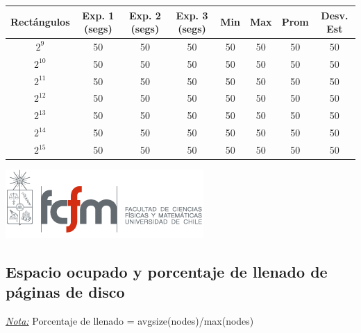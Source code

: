 \documentclass[letterpaper,10pt]{article}
\begin{document}
	\begin{center}

		\begin{tabular}{|c|c|c|c|c|c|c|c|}
			\hline
			Rectángulos	& Exp. 1 (segs) & Exp. 2 (segs) & Exp. 3 (segs) & Min & Max & Prom & Desv. Est\\
			\hline
			$2^{9}$ 	& 50 	& 50 	& 50 	& 50 	& 50 	& 50 	& 50 \\
			\hline
			$2^{10}$ 	& 50 	& 50 	& 50 	& 50 	& 50 	& 50 	& 50 \\
			\hline
			$2^{11}$ 	& 50 	& 50 	& 50 	& 50 	& 50 	& 50 	& 50 \\
			\hline
			$2^{12}$ 	& 50 	& 50 	& 50 	& 50 	& 50 	& 50 	& 50 \\
			\hline
			$2^{13}$ 	& 50 	& 50 	& 50 	& 50 	& 50 	& 50 	& 50 \\
			\hline
			$2^{14}$ 	& 50 	& 50 	& 50 	& 50 	& 50 	& 50 	& 50 \\
			\hline
			$2^{15}$ 	& 50 	& 50 	& 50 	& 50 	& 50 	& 50 	& 50 \\
			\hline
		\end{tabular}

		\includegraphics{logoFCFM.png}
	\end{center}

	\subsection{Espacio ocupado y porcentaje de llenado de páginas de disco}

	\underline{\textit{Nota:}} Porcentaje de llenado = avgsize(nodes)/max(nodes)
\end{document}
